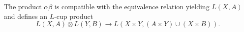 The product $\alpha\beta$ is compatible with the equivalence relation yielding $L(X, A)$ and defines an $L$-cup product
$$L(X, A) \otimes L(Y, B) \rightarrow L(X \times Y, (A \times Y) \cup (X \times B)).$$
